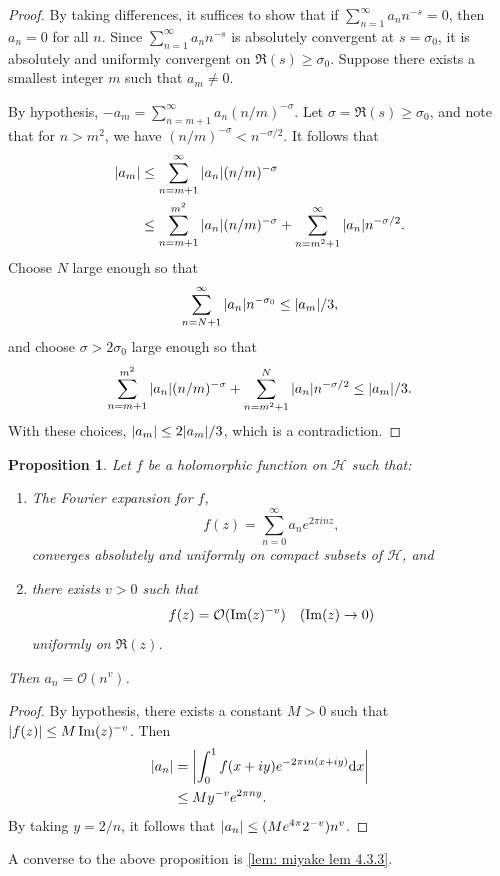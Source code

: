\documentclass[10pt,leqno,twoside]{article}
\theoremstyle{plain}
\newtheorem{proposition}[lem]{Proposition}
\theoremstyle{definition}
\numberwithin{equation}{section}
\numberwithin{lem}{section}
\begin{document}
\begin{proof}
    By taking differences, it suffices to show that if $\sum_{n=1}^\infty a_nn^{-s} = 0$, then $a_n = 0$ for all $n$. Since $\sum_{n=1}^\infty a_nn^{-s}$ is absolutely convergent at $s = \sigma_0$, it is absolutely and uniformly convergent on $\Re(s)\geq \sigma_0$. Suppose there exists a smallest integer $m$ such that $a_m \neq 0$.
    
    By hypothesis, $-a_m = \sum_{n=m+1}^\infty a_n (n/m)^{-\sigma}$. Let $\sigma = \Re(s)\geq \sigma_0$, and note that for $n>m^2$, we have $(n/m)^{-\sigma}<n^{-\sigma/2}$. It follows that
    \begin{align*}
        \abs{a_m} &\leq \sum_{n=m+1}^\infty \abs{a_n} (n/m)^{-\sigma}\\
        &\leq \sum_{n=m+1}^{m^2} \abs{a_n} (n/m)^{-\sigma} + \sum_{n=m^2+1}^\infty \abs{a_n} n^{-\sigma/2}.
    \end{align*}
    Choose $N$ large enough so that
    \[\sum_{n=N+1}^\infty \abs{a_n}n^{-\sigma_0}\leq \abs{a_m}/3,\]
    and choose $\sigma>2\sigma_0$ large enough so that 
    \[\sum_{n=m+1}^{m^2} \abs{a_n} (n/m)^{-\sigma} + \sum_{n=m^2+1}^N \abs{a_n}n^{-\sigma/2}\leq \abs{a_m}/3.\] With these choices, $\abs{a_m}\leq 2\abs{a_m}/3$, which is a contradiction.
\end{proof}
\begin{proposition}\label{prop: miyake prop pre-lemma 4.3.3}
    Let $f$ be a holomorphic function on $\mathcal H$ such that: 
    \begin{enumerate}[label = \textup{(\arabic*)}]
        \item The Fourier expansion for $f$, \[f(z) = \sum_{n=0}^\infty a_ne^{2\pi i nz},\] converges absolutely and uniformly on compact subsets of $\mathcal H$, and
        \item there exists $v>0$ such that \[f(z) = \mathcal O(\Im(z)^{-v}) \quad \textup{($\Im(z)\to 0$)}\] uniformly on $\Re(z)$. 
    \end{enumerate}
    Then $a_n = \mathcal O(n^v)$.
\end{proposition}
\begin{proof}
    By hypothesis, there exists a constant $M>0$ such that $\abs{f(z)}\leq M\Im(z)^{-v}$. Then \begin{align*}
        \abs{a_n} &= \abs{\int_0^1 f(x+iy)e^{-2\pi i n (x+iy)}\dd x}\\
        &\leq My^{-v}e^{2\pi n y}.
    \end{align*} By taking $y = 2/n$, it follows that $\abs{a_n} \leq (Me^{4\pi}2^{-v})n^v$.
\end{proof} A converse to the above proposition is \cref{lem: miyake lem 4.3.3}.
\end{document}
